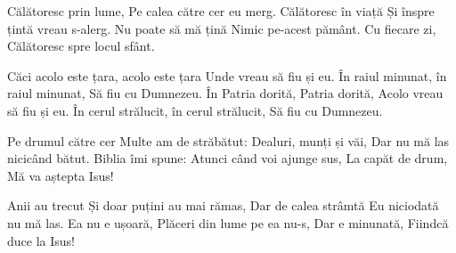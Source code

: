 \beginverse
Călătoresc prin lume,
Pe calea către cer eu merg.
Călătoresc în viață
Și înspre țintă vreau s-alerg.
Nu poate să mă țină
Nimic pe-acest pământ.
Cu fiecare zi,
Călătoresc spre locul sfânt.
\endverse

\beginchorus
Căci acolo este țara, acolo este țara
Unde vreau să fiu și eu.
În raiul minunat, în raiul minunat,
Să fiu cu Dumnezeu.
În Patria dorită, Patria dorită,
Acolo vreau să fiu și eu.
În cerul strălucit, în cerul strălucit,
Să fiu cu Dumnezeu.
\endchorus

\beginverse
Pe drumul către cer
Multe am de străbătut:
Dealuri, munți și văi,
Dar nu mă las nicicând bătut.
Biblia îmi spune:
Atunci când voi ajunge sus,
La capăt de drum,
Mă va aștepta Isus!
\endverse

\beginverse
Anii au trecut
Și doar puțini au mai rămas,
Dar de calea strâmtă
Eu niciodată nu mă las.
Ea nu e ușoară,
Plăceri din lume pe ea nu-s,
Dar e minunată,
Fiindcă duce la Isus!
\endverse
\endsong